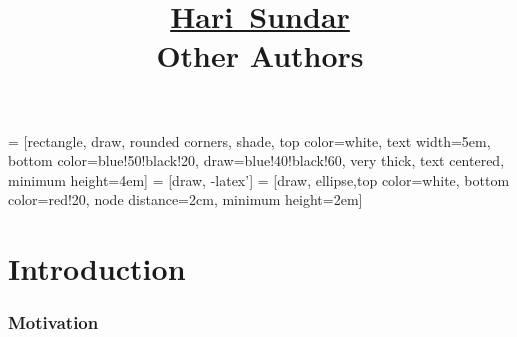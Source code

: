 \documentclass[mathserif,18pt,xcolor=table]{beamer}
\title[My Talk Title}
\author[Hari Sundar]{ \underline{Hari~Sundar} \\  
Other Authors
}
\institute{Institute for Computational Engineering \& Sciences\\ \mbox{}  \\  \pgfuseimage{utbig} }
\date[Supercomputing 2012]{\pgfuseimage{sclogo} }
\begin{document}
 = [rectangle, draw, rounded corners, shade, top color=white, text width=5em,
  bottom color=blue!50!black!20, draw=blue!40!black!60, very thick, text centered, minimum height=4em]
   = [draw, -latex']
   = [draw, ellipse,top color=white, bottom color=red!20, node distance=2cm, minimum height=2em]


  \beamertemplateballitem

  \frame{\titlepage}



\section{Introduction}

\begin{frame}[t]
\frametitle{Motivation}
\framesubtitle{~~}  %


\end{frame}
\end{document}
